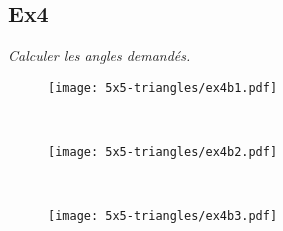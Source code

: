 \begin{multicols}{4}
\Pointilles[4] 
\columnbreak 

\Pointilles[4] 
\columnbreak 

\Pointilles[4] 
\columnbreak 

\Pointilles[4] 
\columnbreak 
\end{multicols}


\subsection*{Ex4}
\textit{Calculer les angles demandés.}

\begin{minipage}[t]{0.4\textwidth}
  \begin{figure}[H]
    \centering
    \texttt{[image: 5x5-triangles/ex4b1.pdf]}
  \end{figure}
\end{minipage}
\begin{minipage}[t]{0.6\textwidth}
  \Pointilles[10] \\
\end{minipage}

\begin{minipage}[t]{0.4\textwidth}
  \begin{figure}[H]
    \centering
    \texttt{[image: 5x5-triangles/ex4b2.pdf]}
  \end{figure} 
\end{minipage}
\begin{minipage}[t]{0.6\textwidth}
  \Pointilles[10] \\
\end{minipage}

\begin{minipage}[t]{0.4\textwidth}
\begin{figure}[H]
    \centering
    \texttt{[image: 5x5-triangles/ex4b3.pdf]}
  \end{figure} 
\end{minipage}
\begin{minipage}[t]{0.6\textwidth}
  \Pointilles[10]
\end{minipage}

